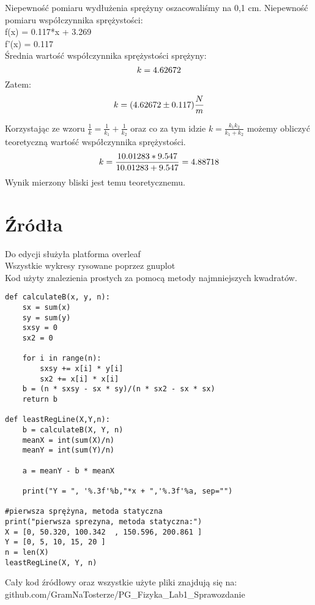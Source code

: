 \documentclass[11pt,a4paper]{article}
\begin{document}
    Niepewność pomiaru wydłużenia sprężyny oszacowaliśmy na 0,1 cm.
    Niepewność pomiaru współczynnika sprężystości:
    \\f(x) = 0.117*x + 3.269 \\
    f'(x) = 0.117 \\
    
    Średnia wartość współczynnika sprężystości sprężyny:
    \[ k = \pgfmathparse{((4*(3.14)^2 * 0.050155  / ((13.91+13.88+13.96)/(3*20))^2) + (4*(3.14)^2 * 0.100478  / ((18.58+18.45+18.40)/(3*20))^2) + (4*(3.14)^2 * 0.150614  / ((22.16+22.15+22.16)/(3*20))^2) + (4*(3.14)^2 * 0.200790  / ((25.32+25.36+25.30)/(3*20))^2))/4}\pgfmathresult \]
    Zatem: 
    \[ k = (\pgfmathparse{((4*(3.14)^2 * 0.050155  / ((13.91+13.88+13.96)/(3*20))^2) + (4*(3.14)^2 * 0.100478  / ((18.58+18.45+18.40)/(3*20))^2) + (4*(3.14)^2 * 0.150614  / ((22.16+22.15+22.16)/(3*20))^2) + (4*(3.14)^2 * 0.200790  / ((25.32+25.36+25.30)/(3*20))^2))/4}\pgfmathresult \pm  0.117) \frac{N}{m} \]
    \pagebreak
    
    Korzystając ze wzoru $\frac{1}{k} = \frac{1}{k_1} + \frac{1}{k_2}$ oraz co za tym idzie $k = \frac{k_1k_2}{k_1+k_2}$ możemy obliczyć teoretyczną wartość współczynnika sprężystości.
    \[ k = \frac{10.01283 * 9.547}{10.01283 +  9.547} = \pgfmathparse{(10.01283*9.547)/(10.01283 +  9.547)}\pgfmathresult\]
    Wynik mierzony bliski jest temu teoretycznemu.
    
    \section{Źródła}
    Do edycji służyła platforma overleaf \\
    Wszystkie wykresy rysowane poprzez gnuplot \\
    Kod użyty znalezienia prostych za pomocą metody najmniejszych kwadratów.
    \begin{verbatim}
def calculateB(x, y, n):
	sx = sum(x)
	sy = sum(y)
	sxsy = 0
	sx2 = 0

	for i in range(n):
		sxsy += x[i] * y[i]
		sx2 += x[i] * x[i]
	b = (n * sxsy - sx * sy)/(n * sx2 - sx * sx)
	return b

def leastRegLine(X,Y,n):
	b = calculateB(X, Y, n)
	meanX = int(sum(X)/n)
	meanY = int(sum(Y)/n)

	a = meanY - b * meanX

	print("Y = ", '%.3f'%b,"*x + ",'%.3f'%a, sep="")

#pierwsza sprężyna, metoda statyczna
print("pierwsza sprezyna, metoda statyczna:")
X = [0, 50.320, 100.342  , 150.596, 200.861 ]
Y = [0, 5, 10, 15, 20 ]
n = len(X)
leastRegLine(X, Y, n)
    \end{verbatim}

    Cały kod źródłowy oraz wszystkie użyte pliki znajdują się na: \\
    github.com/GramNaTosterze/PG\_Fizyka\_Lab1\_Sprawozdanie \\
\end{document}
